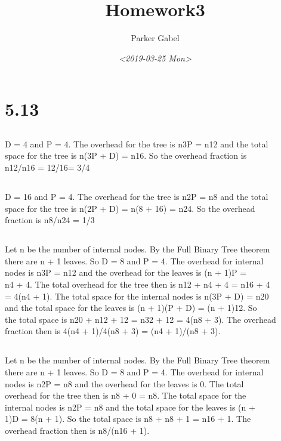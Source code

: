 \documentclass[11pt]{article}
\author{Parker Gabel}
\date{\textit{<2019-03-25 Mon>}}
\title{Homework3}
\begin{document}
\maketitle
\section{5.13}
\label{sec:orgff174d5}
\subsection{}
\label{sec:org200df3c}
D = 4 and P = 4. The overhead for the tree is n3P = n12 and the total\\
space for the tree is n(3P + D) = n16. So the overhead fraction is\\
n12/n16 = 12/16= 3/4\\
\subsection{}
\label{sec:org2c45299}
D = 16 and P = 4. The overhead for the tree is n2P = n8 and the total\\
space for the tree is n(2P + D) = n(8 + 16) = n24. So the overhead\\
fraction is n8/n24 = 1/3\\
\subsection{}
\label{sec:orgde8feba}
Let n be the number of internal nodes. By the Full Binary Tree theorem\\
there are n + 1 leaves. So D = 8 and P = 4. The overhead for internal\\
nodes is n3P = n12 and the overhead for the leaves is (n + 1)P =\\
n4 + 4. The total overhead for the tree then is n12 + n4 + 4 = n16 + 4\\
= 4(n4 + 1). The total space for the internal nodes is n(3P + D) = n20\\
and the total space for the leaves is (n + 1)(P + D) = (n + 1)12. So\\
the total space is n20 + n12 + 12 = n32 + 12 = 4(n8 + 3). The overhead\\
fraction then is 4(n4 + 1)/4(n8 + 3) = (n4 + 1)/(n8 + 3).\\
\subsection{}
\label{sec:orgdbd3b43}
Let n be the number of internal nodes. By the Full Binary Tree theorem\\
there are n + 1 leaves. So D = 8 and P = 4. The overhead for internal\\
nodes is n2P = n8 and the overhead for the leaves is 0. The total\\
overhead for the tree then is n8 + 0 = n8. The total space for the\\
internal nodes is n2P = n8 and the total space for the leaves is (n +\\
1)D = 8(n + 1). So the total space is n8 + n8 + 1 = n16 + 1. The\\
overhead fraction then is n8/(n16 + 1).\\
\end{document}
